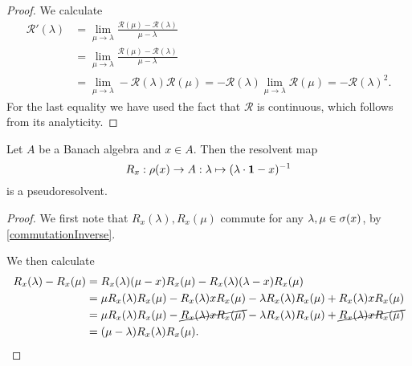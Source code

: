 \begin{proof}
We calculate
\begin{align*}
\mathcal{R}'(\lambda) &= \lim_{\mu\to\lambda} \frac{\mathcal{R}(\mu) - \mathcal{R}(\lambda)}{\mu-\lambda} \\
&= \lim_{\mu\to\lambda} \frac{\mathcal{R}(\mu) - \mathcal{R}(\lambda)}{\mu-\lambda} \\
&= \lim_{\mu\to\lambda} -\mathcal{R}(\lambda)\mathcal{R}(\mu) = -\mathcal{R}(\lambda)\lim_{\mu\to\lambda} \mathcal{R}(\mu) = -\mathcal{R}(\lambda)^2.
\end{align*}
For the last equality we have used the fact that $\mathcal{R}$ is continuous, which follows from its analyticity.
\end{proof}

\begin{proposition} \label{firstResolventIdentity}
Let $A$ be a Banach algebra and $x\in A$. Then the resolvent map
\[ R_x: \rho(x)\to A: \lambda \mapsto (\lambda\cdot\boldsymbol{\mathrm{1}} - x)^{-1} \]
is a pseudoresolvent.
\end{proposition}
\begin{proof}
We first note that $R_x(\lambda), R_x(\mu)$ commute for any $\lambda,\mu\in\sigma(x)$, by \ref{commutationInverse}.

We then calculate
\begin{align*}
R_x(\lambda) - R_x(\mu) &= R_x(\lambda)(\mu - x)R_x(\mu) - R_x(\lambda)(\lambda - x)R_x(\mu) \\
&= \mu R_x(\lambda)R_x(\mu) - R_x(\lambda)xR_x(\mu) - \lambda R_x(\lambda)R_x(\mu) + R_x(\lambda)xR_x(\mu) \\
&= \mu R_x(\lambda)R_x(\mu) - \cancel{R_x(\lambda)xR_x(\mu)} - \lambda R_x(\lambda)R_x(\mu) + \cancel{R_x(\lambda)xR_x(\mu)} \\
&= (\mu - \lambda)R_x(\lambda)R_x(\mu).
\end{align*}
\end{proof}


